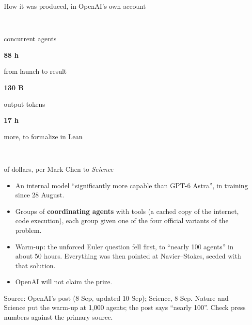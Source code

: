 \documentclass[aspectratio=169, 10pt]{beamer}
\newcommand{\src}[1]{{\par\vspace{2pt}\scriptsize\color{inkmuted}#1\par}}
\newcommand{\q}[1]{``#1''}
\newcommand{\tile}[2]{%
  {\setlength{\fboxsep}{5pt}\colorbox{layer}{%
    \begin{minipage}[c][1.35cm][c]{2.4cm}\centering
      {\LARGE\bfseries\color{navy}#1}\\[3pt]
      {\fontsize{7}{7.5}\selectfont\color{inksec}#2\par}%
    \end{minipage}}}}
\begin{document}
\begin{frame}{How it was produced, in OpenAI's own account}
  \centering
  \tile{{\Large $\sim$10,000}}{concurrent agents}\hfill
  \tile{88 h}{from launch to result}\hfill
  \tile{130 B}{output tokens}\hfill
  \tile{17 h}{more, to formalize in Lean}\hfill
  \tile{{\Large millions}}{of dollars, per Mark Chen to \emph{Science}}
  \vspace{8pt}
  \begin{itemize}
    \item An internal model \q{significantly more capable than GPT-6 Astra},
      in training since 28 August.
    \item Groups of \textbf{coordinating agents} with tools (a cached copy of
      the internet, code execution), each group given one of the four official
      variants of the problem.
    \item Warm-up: the unforced Euler question fell first, to \q{nearly 100
      agents} in about 50 hours. Everything was then pointed at Navier--Stokes,
      seeded with that solution.
    \item OpenAI will not claim the prize.
  \end{itemize}
  \src{Source: OpenAI's post (8 Sep, updated 10 Sep); Science, 8 Sep. Nature and Science put the warm-up at 1,000 agents; the post says \q{nearly 100}. Check press numbers against the primary source.}
\end{frame}
\end{document}
